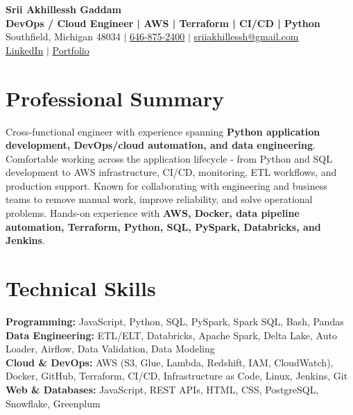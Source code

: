 \documentclass[letterpaper,10pt]{article}
\begin{document}
\fontsize{9.35pt}{10.45pt}\selectfont

\begin{center}
    {\LARGE \textbf{Srii Akhillessh Gaddam}} \\[-1pt]
    \textbf{DevOps / Cloud Engineer | AWS | Terraform | CI/CD | Python} \\[2pt]
    Southfield, Michigan 48034 $|$
    \href{tel:6468752400}{646-875-2400} $|$
    \href{mailto:sriiakhillessh@gmail.com}{sriiakhillessh@gmail.com} \\[1pt]
    \href{https://www.linkedin.com/in/srii-akhiilessh-gaddam-b48668191/}{LinkedIn} $|$
    \href{https://sriiakhillesshg.github.io/portfolio/}{Portfolio}
\end{center}
\vspace{-8pt}

\section{Professional Summary}
\small{Cross-functional engineer with experience spanning \textbf{Python application development, DevOps/cloud automation, and data engineering}. Comfortable working across the application lifecycle - from Python and SQL development to AWS infrastructure, CI/CD, monitoring, ETL workflows, and production support. Known for collaborating with engineering and business teams to remove manual work, improve reliability, and solve operational problems. Hands-on experience with \textbf{AWS, Docker, data pipeline automation, Terraform, Python, SQL, PySpark, Databricks, and Jenkins}.}

\section{Technical Skills}
\small{
\textbf{Programming:} JavaScript, Python, SQL, PySpark, Spark SQL, Bash, Pandas \\
\textbf{Data Engineering:} ETL/ELT, Databricks, Apache Spark, Delta Lake, Auto Loader, Airflow, Data Validation, Data Modeling \\
\textbf{Cloud \& DevOps:} AWS (S3, Glue, Lambda, Redshift, IAM, CloudWatch), Docker, GitHub, Terraform, CI/CD, Infrastructure as Code, Linux, Jenkins, Git \\
\textbf{Web \& Databases:} JavaScript, REST APIs, HTML, CSS, PostgreSQL, Snowflake, Greenplum
}
\end{document}
